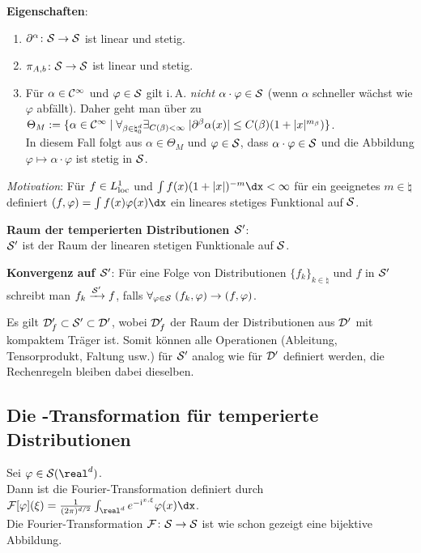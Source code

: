 \textbf{Eigenschaften}:
\begin{enumerate}
    \item
    $\partial^\alpha\colon \S \rightarrow \S$ ist linear und stetig.

    \item
    $\pi_{A,b}\colon \S \rightarrow \S$ ist linear und stetig.

    \item
    Für $\alpha \in \C^\infty$ und $\varphi \in \S$ gilt i.\,A. \emph{nicht}
    $\alpha \cdot \varphi \in \S$
    (wenn $\alpha$ schneller wächst wie $\varphi$ abfällt).
    Daher geht man über zu $\Theta_M := \{\alpha \in \C^\infty \;|\;
    \forall_{\beta \in \natural_0^d} \exists_{C(\beta) < \infty}\;
    |\partial^\beta \alpha(x)| \le C(\beta) (1 + |x|^{m_\beta})\}$.\\
    In diesem Fall folgt aus $\alpha \in \Theta_M$ und $\varphi \in \S$,
    dass $\alpha \cdot \varphi \in \S$ und die Abbildung
    $\varphi \mapsto \alpha \cdot \varphi$ ist stetig in $\S$.
\end{enumerate}

\linie

\emph{Motivation}:
Für $f \in L^1_\loc$ und $\int f(x) (1 + |x|)^{-m} \dx < \infty$ für ein
geeignetes $m \in \natural$ definiert
$(f, \varphi) = \int f(x) \varphi(x)\dx$ ein lineares stetiges Funktional auf
$\S$.

\textbf{Raum der temperierten Distributionen $\S'$}:\\
$\S'$ ist der Raum der linearen stetigen Funktionale auf $\S$.

\textbf{Konvergenz auf $\S'$}:
Für eine Folge von Distributionen $\{f_k\}_{k \in \natural}$ und
$f$ in $\S'$ schreibt man $f_k \xrightarrow{\S'} f$, falls
$\forall_{\varphi \in \S}\; (f_k, \varphi) \to (f, \varphi)$.

Es gilt $\D_f' \subset \S' \subset \D'$, wobei
$\D_f'$ der Raum der Distributionen aus $\D'$ mit kompaktem Träger ist.
Somit können alle Operationen
(Ableitung, Tensorprodukt, Faltung usw.)
für $\S'$ analog wie für $\D'$ definiert werden,
die Rechenregeln bleiben dabei dieselben.

\pagebreak

\subsection{%
    Die -Transformation für temperierte Distributionen%
}

Sei $\varphi \in \S(\real^d)$.\\
Dann ist die Fourier-Transformation definiert durch
$\F[\varphi](\xi) = \frac{1}{(2\pi)^{d/2}}
\int_{\real^d} e^{-\i\sp{x, \xi}}\varphi(x)\dx$.\\
Die Fourier-Transformation $\F\colon \S \rightarrow \S$ ist wie schon gezeigt
eine bijektive Abbildung.

